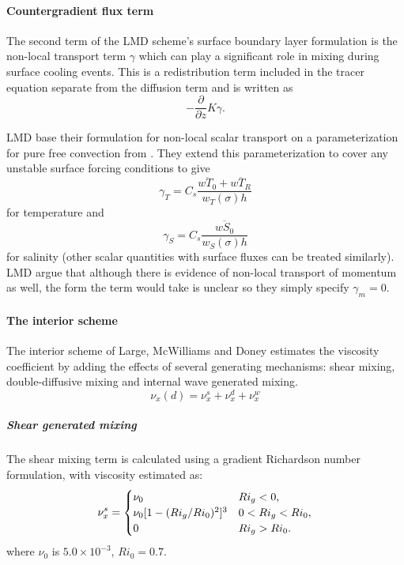 \paragraph{Countergradient flux term}
The second term of the LMD scheme's surface boundary layer
formulation is the non-local transport term $\gamma$ which can play a
significant role in mixing during surface cooling events.  This is a
redistribution term included in the tracer equation separate from the
diffusion term and is written as 
\begin{equation}
-\frac{\partial}{\partial z}K\gamma.
\end{equation}

LMD base their formulation for non-local scalar transport on a
parameterization for pure free convection from
\cite{Mailhot82}. They extend this parameterization to cover any
unstable surface forcing conditions to give
\begin{equation}
  \gamma_{T}=C_s\frac{\overline{wT_0}+
  \overline{wT_R}}{w_T(\sigma)h}
\end{equation}
for temperature and 
\begin{equation}
\gamma_S=C_s \frac{\overline{wS_0}}{w_S(\sigma)h}
\end{equation}
for salinity (other scalar quantities with surface fluxes can be
treated similarly). LMD argue that although there is evidence of
non-local transport of momentum as well, the form the term would take
is unclear so they simply specify $\gamma_m=0$.

\paragraph{The interior scheme}
The interior scheme of Large, McWilliams and Doney estimates the
viscosity coefficient by adding the effects of several generating
mechanisms:  shear mixing, double-diffusive mixing and internal wave
generated mixing.
\begin{equation}
\nu_{x}(d)=\nu_{x}^s+\nu_{x}^d+\nu_{x}^w
\end{equation}

\subparagraph{Shear generated mixing}
The shear mixing term is calculated using a
gradient Richardson number formulation,
with viscosity estimated as: 
\begin{equation}
\nu^s_x=\begin{cases}
\nu_0&   \text{$ Ri_g<0$}, \\
\nu_0[1-(Ri_g/Ri_0)^2]^3&  \text{$0< Ri_g<Ri_0$},  \\
0&   \text{$Ri_g>Ri_0$}.  
\end{cases}
\end{equation}
where $\nu_0$ is $5.0 \times 10^{-3}$, $Ri_0 = 0.7$.  

